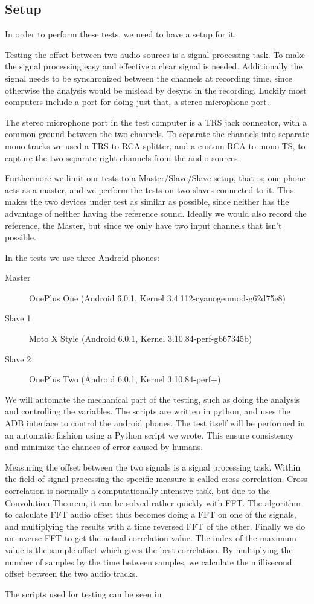 \subsection{Setup}
In order to perform these tests, we need to have a setup for it. 

Testing the offset between two audio sources is a signal processing
task. To make the signal processing easy and effective a clear signal is
needed. Additionally the signal needs to be synchronized between the
channels at recording time, since otherwise the analysis would be
mislead by desync in the recording. Luckily most computers include
a port for doing just that, a stereo microphone port.

The stereo microphone port in the test computer is a \ac{TRS} jack
connector, with a common ground between the two channels. To separate
the channels into separate mono tracks we used a \ac{TRS} to \ac{RCA}
splitter, and a custom \ac{RCA} to mono \ac{TS}, to capture the two
separate right channels from the audio sources.

Furthermore we limit our tests to a Master/Slave/Slave setup, that is;
one phone acts as a master, and we perform the tests on two slaves
connected to it. This makes the two devices under test as similar as
possible, since neither has the advantage of neither having the
reference sound. Ideally we would also record the reference, the Master,
but since we only have two input channels that isn't possible.

In the tests we use three Android phones:
\begin{description}
	\item[Master]{OnePlus One (Android 6.0.1, Kernel 3.4.112-cyanogenmod-g62d75e8)}
	\item[Slave 1]{Moto X Style (Android 6.0.1, Kernel 3.10.84-perf-gb67345b)}
	\item[Slave 2]{OnePlus Two (Android 6.0.1, Kernel 3.10.84-perf+)}
\end{description}

We will automate the mechanical part of the testing, such as doing the
analysis and controlling the variables. The scripts are written in
python, and uses the \ac{ADB} interface to control the android phones.
The test itself will be performed in an automatic fashion using a Python
script we wrote.  This ensure consistency and minimize the chances of
error caused by humans.

Measuring the offset between the two signals is a signal processing
task. Within the field of signal processing the specific measure is
called cross correlation. Cross correlation is normally
a computationally intensive task, but due to the Convolution
Theorem\cite{conv_theo}, it can be solved rather quickly with \ac{FFT}.
The algorithm to calculate \ac{FFT} audio offset thus becomes doing
a \ac{FFT} on one of the signals, and multiplying the results with
a time reversed \ac{FFT} of the other. Finally we do an inverse \ac{FFT}
to get the actual correlation value. The index of the maximum value is
the sample offset which gives the best correlation. By multiplying the
number of samples by the time between samples, we calculate the
millisecond offset between the two audio tracks.

The scripts used for testing can be seen in 
